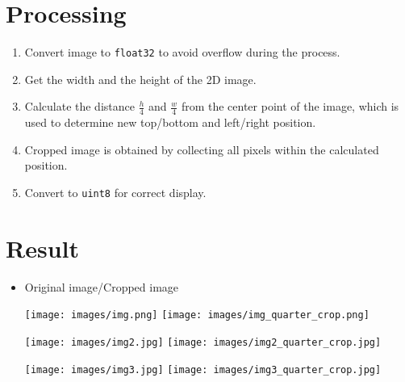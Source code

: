 \section{Processing}
\begin{enumerate}
    \item Convert image to \texttt{float32} to avoid overflow during the process.
    \item Get the width and the height of the 2D image.
    \item Calculate the distance $\frac{h}{4}$ and $\frac{w}{4}$ from the center point of the image, which is used to determine new top/bottom and left/right position.
    \item Cropped image is obtained by collecting all pixels within the calculated position.
    \item Convert to \texttt{uint8} for correct display.
\end{enumerate}

\section{Result}
\begin{itemize}
    \item Original image/Cropped image
    \begin{center}
        \texttt{[image: images/img.png]}
        \texttt{[image: images/img\_quarter\_crop.png]}
    \end{center} 
    \begin{center}
        \texttt{[image: images/img2.jpg]}
        \texttt{[image: images/img2\_quarter\_crop.jpg]}
    \end{center} 
    \begin{center}
        \texttt{[image: images/img3.jpg]}
        \texttt{[image: images/img3\_quarter\_crop.jpg]}
    \end{center} 
\end{itemize}